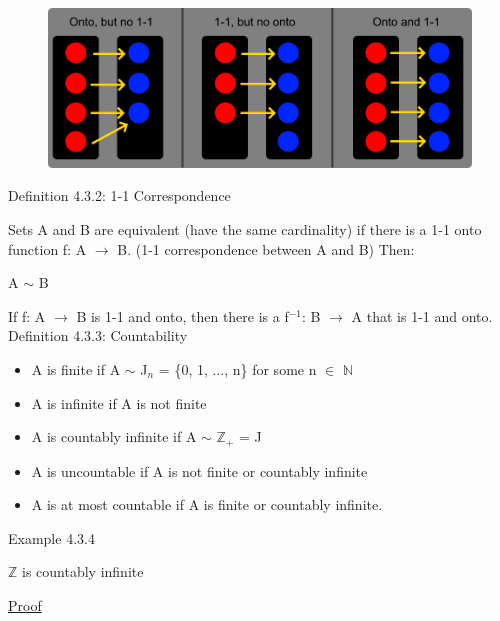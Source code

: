 \begin{figure}[h]
	\centering
	\includegraphics[scale=0.3]{Images/4.3.1.png}
\end{figure}

{ \color{blue} Definition  4.3.2: 1-1 Correspondence} 

	\begin{adjustbox}{minipage=14cm, right}
		Sets A and B are equivalent {\color{lblue} (have the same cardinality)} if there is
		a 1-1 onto function f: A $\rightarrow$ B. {\color{lblue} (1-1 correspondence between A and B)}
		Then:

		\qquad A $\sim$ B

		If f: A $\rightarrow$ B is 1-1 and onto, then
		there is a f$^{-1}$: B $\rightarrow$ A that is 1-1 and onto. \\
	\end{adjustbox}

{ \color{blue} Definition 4.3.3: Countability } 
	\begin{itemize}[leftmargin=2cm, itemsep=0.4em]
		\item A is {\color{lblue} finite} if A $\sim$ J$_n$ = \{0, 1, ..., n\}
			for some n $\in$ $\mathbb{N}$
		\item A is {\color{lblue} infinite} if A is not finite
		\item A is {\color{lblue} countably infinite} if A $\sim$ $\mathbb{Z}_+$ = J
		\item A is {\color{lblue} uncountable} if A is not finite or countably infinite
		\item A is {\color{lblue} at most countable} if A is finite or countably infinite. \\
	\end{itemize}

\newpage

{ \color{purple} Example 4.3.4 } 

	\qquad $\mathbb{Z}$ is countably infinite

{ \color{magenta} \underline{Proof} } 


